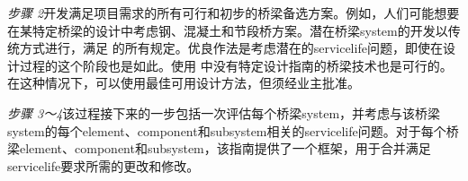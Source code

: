 \emph{步骤 2}\quad 开发满足项目需求的所有可行和初步的桥梁备选方案。例如，人们可能想要在某特定桥梁的设计中考虑钢、混凝土和节段桥方案。潜在桥梁\gls*{system}的开发以传统方式进行，满足 \lrfd 的所有规定。优良作法是考虑潜在的\gls*{servicelife}问题，即使在设计过程的这个阶段也是如此。使用 \lrfd 中没有特定设计指南的桥梁技术也是可行的。在这种情况下，可以使用最佳可用设计方法，但须经业主批准。

\emph{步骤 3～4}\quad 该过程接下来的一步包括一次评估每个桥梁\gls*{system}，并考虑与该桥梁\gls*{system}的每个\gls*{element}、\gls*{component}和\gls*{subsystem}相关的\gls*{servicelife}问题。对于每个桥梁\gls*{element}、\gls*{component}和\gls*{subsystem}，该指南提供了一个框架，用于合并满足\gls*{servicelife}要求所需的更改和修改。

